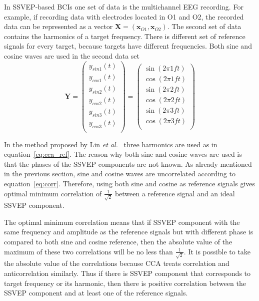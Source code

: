 In \gls{SSVEP}-based \glspl{BCI} one set of data is the multichannel \gls{EEG} recording. For example, if recording data with electrodes located in O1 and O2, the recorded data can be represented as a vector $\mathbf{X}=(\mathbf{x}_{O1}, \mathbf{x}_{O2})$. The second set of data contains the \glspl{harmonic} of a \gls{target} frequency. There is different set of reference signals for every \gls{target}, because \glspl{target} have different frequencies. Both sine and cosine waves are used in the second data set
\begin{equation}
	\label{eq:cca_ref}
	\mathbf{Y}=\begin{pmatrix}
		y_{sin1}(t)\\
		y_{cos1}(t)\\
		y_{sin2}(t)\\
		y_{cos2}(t)\\
		y_{sin3}(t)\\
		y_{cos3}(t)\\
	\end{pmatrix}=\begin{pmatrix}
		\sin(2\pi 1ft)\\
		\cos(2\pi 1ft)\\
		\sin(2\pi 2ft)\\
		\cos(2\pi 2ft)\\
		\sin(2\pi 3ft)\\
		\cos(2\pi 3ft)\\
	\end{pmatrix}
\end{equation}

In the method proposed by Lin \textit{et al.}~\cite{cca_lin} three harmonics are used as in equation~\ref{eq:cca_ref}. The reason why both sine and cosine waves are used is that the phases of the \gls{SSVEP} components are not known. As already mentioned in the previous section, sine and cosine waves are uncorrelated according to equation~\ref{eq:corr}. Therefore, using both sine and cosine as reference signals gives optimal minimum correlation of $\frac{1}{\sqrt{2}}$ between a reference signal and an ideal \gls{SSVEP} component.

The optimal minimum correlation means that if \gls{SSVEP} component with the same frequency and amplitude as the reference signals but with different phase is compared to both sine and cosine reference, then the absolute value of the maximum of these two correlations will be no less than $\frac{1}{\sqrt{2}}$. It is possible to take the absolute value of the correlations because \gls{CCA} treats correlation and anticorrelation similarly.
Thus if there is \gls{SSVEP} component that corresponds to \gls{target} frequency or its \gls{harmonic}, then there is positive correlation between the \gls{SSVEP} component and at least one of the reference signals.

